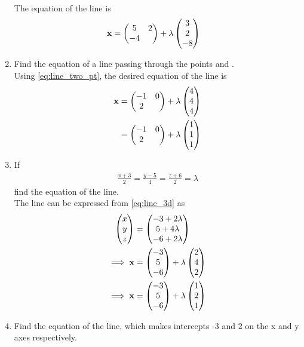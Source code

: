 \documentclass[journal,12pt,twocolumn]{IEEEtran}
\renewcommand\thesection{\arabic{section}}
\begin{document}
\begin{enumerate}[label=\thesection.\arabic*.,ref=\thesection.\theenumi]
\\
\solution The equation of the line is 
\begin{align}
\mathbf{x} &= \begin{pmatrix}5 & 2\\-4\end{pmatrix} + \lambda \begin{pmatrix}3\\2\\-8\end{pmatrix}
\end{align}
%
\item Find the equation of a line passing through the points  and .
\\
\solution Using  \eqref{eq:line_two_pt}, the desired equation of the line is
\begin{align}
\mathbf{x} &= \begin{pmatrix}-1 & 0\\2\end{pmatrix} + \lambda \begin{pmatrix}4\\4\\4\end{pmatrix}
\\
&= \begin{pmatrix}-1 & 0\\2\end{pmatrix} + \lambda \begin{pmatrix}1\\1\\1\end{pmatrix}
\end{align}
%
\item If
\begin{align}
%
\label{eq:line_3d}
\frac{x+3}{2} = \frac{y-5}{4} = \frac{z+6}{2} = \lambda
\end{align}
%
find the equation of the line.
\label{prob:line_3d}
\\
\solution The line can be expressed from \eqref{eq:line_3d} as
%
\begin{align}
\begin{pmatrix}x\\y\\z\end{pmatrix} &= \begin{pmatrix}-3+2\lambda\\5+4\lambda\\-6+2\lambda\end{pmatrix}
\\
\implies \mathbf{x} &= \begin{pmatrix}-3\\5\\-6\end{pmatrix} + \lambda \begin{pmatrix}2\\4\\2\end{pmatrix}
\\
\implies \mathbf{x} &= \begin{pmatrix}-3\\5\\-6\end{pmatrix} + \lambda \begin{pmatrix}1\\2\\1\end{pmatrix}
\end{align}
%
\item Find the equation of the line, which makes intercepts -3 and 2 on the x and y axes respectively.

\end{enumerate}
\end{document}
